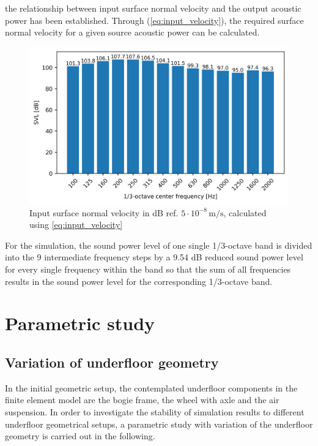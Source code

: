 the relationship between input surface normal velocity and the output acoustic power has been established. Through (\ref{eq:input_velocity}), the required surface normal velocity for a given source acoustic power can be calculated.

\begin{figure}[H]
	\centering
	\includegraphics{fig/chap4/input_SVL.png}
	\caption{Input surface normal velocity in dB ref. $5\cdot10^{-8}\,\text{m/s}$, calculated using \ref{eq:input_velocity}}
\end{figure}

For the simulation, the sound power level of one single 1/3-octave band is divided into the 9 intermediate frequency steps by a 9.54 dB reduced sound power level for every single frequency within the band so that the sum of all frequencies results in the sound power level for the corresponding 1/3-octave band.




\newpage
\section{Parametric study}
\label{section:parametric_study}
\subsection{Variation of underfloor geometry}
\label{section:variation_geometry}

In the initial geometric setup, the contemplated underfloor components in the finite element model are the bogie frame, the wheel with axle and the air suspension. In order to investigate the stability of simulation results to different underfloor geometrical setups, a parametric study with variation of the underfloor geometry is carried out in the following.

